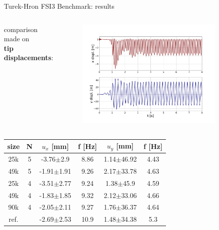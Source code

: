 \documentclass[10pt,t]{beamer}
\begin{document}
\begin{frame}{Turek-Hron FSI3 Benchmark: results}

\begin{columns}

comparison made on \\ \textbf{tip displacements}:



\vspace{-1cm}
\begin{figure}[htbp!]
	\includegraphics[width=0.9\textwidth, trim=20 20 20 20, clip]{images/FSI3/fsi3_displ_pres.png}
\end{figure}


\end{columns}



\footnotesize
\begin{table}[h!]
\label{tab:fsi3_d}
\begin{center}
\begin{tabular}{ c | c | c c | c c  }
size & N & $u_x$ [\si{mm}] & f [\si{Hz}] & $u_y$ [\si{mm}]  & f [\si{Hz}] \\
\hline
25k & 5   & -3.76$\pm$2.9 & 8.86 & 1.14$\pm$46.92 & 4.43   \\
\hline
49k  & 5   & -1.91$\pm$1.91   & 9.26 & 2.17$\pm$33.78 & 4.63 \\
\hline
25k & 4 & -3.51$\pm$2.77 & 9.24 & 1.38$\pm$45.9 & 4.59   \\
\hline
49k  & 4   & -1.83$\pm$1.85   & 9.32 & 2.12$\pm$33.06 & 4.66 \\
\hline
90k  & 4   & -2.05$\pm$2.11   & 9.27 & 1.76$\pm$36.37 & 4.64 \\
\hline
\hline
ref.  &  & -2.69$\pm$2.53  & 10.9 & 1.48$\pm$34.38 & 5.3  \\
\hline
\end{tabular}
\end{center}
\end{table}


\end{frame}
\end{document}
